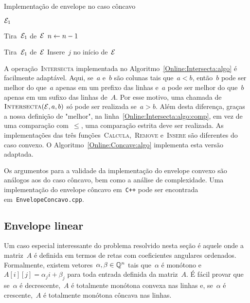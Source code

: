 \begin{algorithm}[b]
\caption{Implementação de envelope no caso côncavo}
\label{Online:Concave:algo}
\begin{algorithmic}[1]
    \State \Return $\mathcal{E}_{1}$
\EndFunction

     \label{Online:Convexo:algo:RemTira}
        \State Tira~$\mathcal{E}_{1}$ de~$\mathcal{E}$
    \EndIf
    \State $n \leftarrow n-1$
\EndFunction

     \label{Online:Convexo:algo:InsTira}
            \State Tira~$\mathcal{E}_{1}$ de~$\mathcal{E}$
        \EndWhile
        \State Insere~$j$ no início de~$\mathcal{E}$
    \EndIf
\EndFunction
\end{algorithmic}
\end{algorithm}

A operação~\textsc{Intersecta} implementada no Algoritmo~\ref{Online:Intersecta:algo} é facilmente adaptável. Aqui, se~$a$ e~$b$ são colunas tais que~$a < b$, então~$b$ pode ser melhor do que~$a$ apenas em um prefixo das linhas e~$a$ pode ser melhor do que~$b$ apenas em um sufixo das linhas de~$A$. Por esse motivo, uma chamada de~$\textsc{Intersecta}(\mathcal{E},a,b)$ só pode ser realizada se~$a > b$. Além desta diferença, graças a nossa definição de "melhor", na linha~\ref{Online:Intersecta:algo:comp}, em vez de uma comparação com~$\leq$, uma comparação estrita deve ser realizada. As implementações das três funções~\textsc{Calcula},~\textsc{Remove} e~\textsc{Insere} são diferentes do caso convexo. O Algoritmo~\ref{Online:Concave:algo} implementa esta versão adaptada.

Os argumentos para a validade da implementação do envelope convexo são análogos aos do caso côncavo, bem como a análise de complexidade. Uma implementação do envelope côncavo em~\texttt{C++} pode ser encontrada em~\texttt{EnvelopeConcavo.cpp}.


\subsection{Envelope linear} \label{Online:linear}

Um caso especial interessante do problema resolvido nesta seção é aquele onde a matriz~$A$ é definida em termos de retas com coeficientes angulares ordenados. Formalmente, existem vetores~$\alpha,\beta \in \mathbb{Q}^n$ tais que~$\alpha$ é monótono e~$A[i][j] = \alpha_j i + \beta_j$ para toda entrada definida da matriz~$A$. É fácil provar que se~$\alpha$ é decrescente,~$A$ é totalmente monótona convexa nas linhas e, se~$\alpha$ é crescente,~$A$ é totalmente monótona côncava nas linhas.

